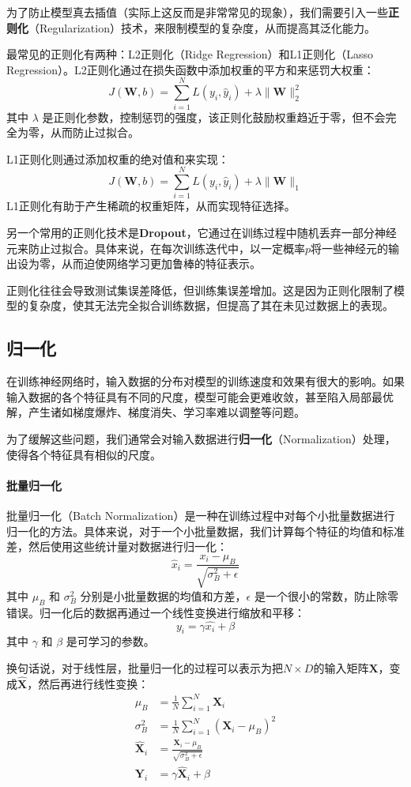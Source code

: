 为了防止模型真去插值（实际上这反而是非常常见的现象），我们需要引入一些\textbf{正则化}（Regularization）技术，来限制模型的复杂度，从而提高其泛化能力。

最常见的正则化有两种：L2正则化（Ridge Regression）和L1正则化（Lasso Regression）。L2正则化通过在损失函数中添加权重的平方和来惩罚大权重：
\[ J(\mathbf{W}, b) = \sum_{i=1}^{N} L(y_i, \hat{y}_i) + \lambda \|\mathbf{W}\|_2^2 \]
其中 $\lambda$ 是正则化参数，控制惩罚的强度，该正则化鼓励权重趋近于零，但不会完全为零，从而防止过拟合。

L1正则化则通过添加权重的绝对值和来实现：
\[ J(\mathbf{W}, b) = \sum_{i=1}^{N} L(y_i, \hat{y}_i) + \lambda \|\mathbf{W}\|_1 \]
L1正则化有助于产生稀疏的权重矩阵，从而实现特征选择。

另一个常用的正则化技术是\textbf{Dropout}，它通过在训练过程中随机丢弃一部分神经元来防止过拟合。具体来说，在每次训练迭代中，以一定概率$p$将一些神经元的输出设为零，从而迫使网络学习更加鲁棒的特征表示。

正则化往往会导致测试集误差降低，但训练集误差增加。这是因为正则化限制了模型的复杂度，使其无法完全拟合训练数据，但提高了其在未见过数据上的表现。

\subsection{归一化}

在训练神经网络时，输入数据的分布对模型的训练速度和效果有很大的影响。如果输入数据的各个特征具有不同的尺度，模型可能会更难收敛，甚至陷入局部最优解，产生诸如梯度爆炸、梯度消失、学习率难以调整等问题。

为了缓解这些问题，我们通常会对输入数据进行\textbf{归一化}（Normalization）处理，使得各个特征具有相似的尺度。

\paragraph{批量归一化} 
批量归一化（Batch Normalization）是一种在训练过程中对每个小批量数据进行归一化的方法。具体来说，对于一个小批量数据，我们计算每个特征的均值和标准差，然后使用这些统计量对数据进行归一化：
\[ \hat{x}_i = \frac{x_i - \mu_B}{\sqrt{\sigma_B^2 + \epsilon}} \]
其中 $\mu_B$ 和 $\sigma_B^2$ 分别是小批量数据的均值和方差，$\epsilon$ 是一个很小的常数，防止除零错误。归一化后的数据再通过一个线性变换进行缩放和平移：
\[ y_i = \gamma \hat{x_i} + \beta \]
其中 $\gamma$ 和 $\beta$ 是可学习的参数。

换句话说，对于线性层，批量归一化的过程可以表示为把$N \times D$的输入矩阵$\mathbf{X}$，变成$\hat{\mathbf{X}}$，然后再进行线性变换：
\begin{align*}
\mu_B &= \frac{1}{N} \sum_{i=1}^{N} \mathbf{X}_i \\
\sigma_B^2 &= \frac{1}{N} \sum_{i=1}^{N} (\mathbf{X}_i - \mu_B)^2 \\
\hat{\mathbf{X}}_i &= \frac{\mathbf{X}_i - \mu_B}{\sqrt{\sigma_B^2 + \epsilon}} \\
\mathbf{Y}_i &= \gamma \hat{\mathbf{X}}_i + \beta
\end{align*}

